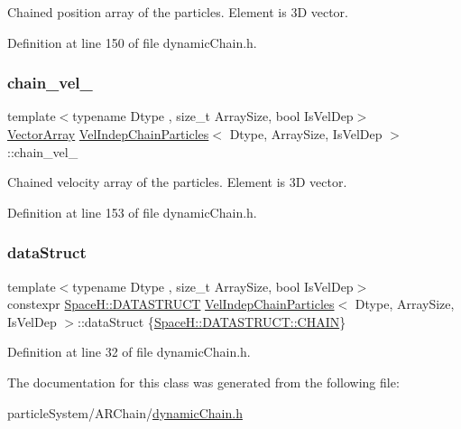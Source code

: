 Chained position array of the particles. Element is 3D vector. 



Definition at line 150 of file dynamic\+Chain.\+h.

\mbox{\label{class_vel_indep_chain_particles_a96ed0f2a5fcfb290dfafb42f08131e2f}} 
\subsubsection{\texorpdfstring{chain\+\_\+vel\+\_\+}{chain\_vel\_}}
{\footnotesize\ttfamily template$<$typename Dtype , size\+\_\+t Array\+Size, bool Is\+Vel\+Dep$>$ \\
\mbox{\hyperlink{class_vel_indep_particles_a27580f65b6523bfb6900520af2e44708}{Vector\+Array}} \mbox{\hyperlink{class_vel_indep_chain_particles}{Vel\+Indep\+Chain\+Particles}}$<$ Dtype, Array\+Size, Is\+Vel\+Dep $>$\+::chain\+\_\+vel\+\_\+\hspace{0.3cm}{\ttfamily [protected]}}



Chained velocity array of the particles. Element is 3D vector. 



Definition at line 153 of file dynamic\+Chain.\+h.

\mbox{\label{class_vel_indep_chain_particles_a58396033a881431db18207bf280892ea}} 
\subsubsection{\texorpdfstring{data\+Struct}{dataStruct}}
{\footnotesize\ttfamily template$<$typename Dtype , size\+\_\+t Array\+Size, bool Is\+Vel\+Dep$>$ \\
constexpr \mbox{\hyperlink{namespace_space_h_a4782f089179a3c269891f02482b072df}{Space\+H\+::\+D\+A\+T\+A\+S\+T\+R\+U\+CT}} \mbox{\hyperlink{class_vel_indep_chain_particles}{Vel\+Indep\+Chain\+Particles}}$<$ Dtype, Array\+Size, Is\+Vel\+Dep $>$\+::data\+Struct \{\mbox{\hyperlink{namespace_space_h_a0af19f79a6498e99dbda772053d44a72a014d2cf3cdc3af6f4f92c09190860e33}{Space\+H\+::\+D\+A\+T\+A\+S\+T\+R\+U\+C\+T\+::\+C\+H\+A\+IN}}\}\hspace{0.3cm}{\ttfamily [static]}}



Definition at line 32 of file dynamic\+Chain.\+h.



The documentation for this class was generated from the following file\+:\begin{DoxyCompactItemize}
\item 
particle\+System/\+A\+R\+Chain/\mbox{\hyperlink{dynamic_chain_8h}{dynamic\+Chain.\+h}}\end{DoxyCompactItemize}
